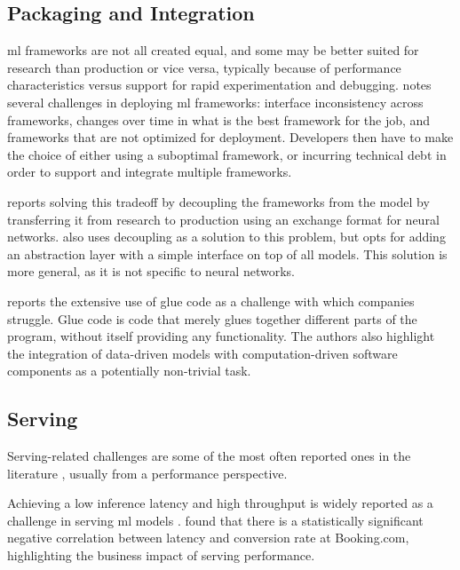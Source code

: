 \subsection{Packaging and Integration}
\acrshort{ml} frameworks are not all created equal, and some may be better suited for research than production or vice versa, typically because of performance characteristics versus support for rapid experimentation and debugging.
\cite{Crankshaw2017} notes several challenges in deploying \acrshort{ml} frameworks: interface inconsistency across frameworks, changes over time in what is the best framework for the job, and frameworks that are not optimized for deployment.
Developers then have to make the choice of either using a suboptimal framework, or incurring technical debt in order to support and integrate multiple frameworks.

\cite{Hazelwood2018} reports solving this tradeoff by decoupling the frameworks from the model by transferring it from research to production using an exchange format for neural networks.
\cite{Crankshaw2017} also uses decoupling as a solution to this problem, but opts for adding an abstraction layer with a simple interface on top of all models.
This solution is more general, as it is not specific to neural networks.

\cite{Bosch2021} reports the extensive use of glue code as a challenge with which companies struggle.
Glue code is code that merely glues together different parts of the program, without itself providing any functionality.
The authors also highlight the integration of data-driven models with computation-driven software components as a potentially non-trivial task.

\subsection{Serving}
Serving-related challenges are some of the most often reported ones in the literature \cite{Bosch2021, Richins2020, Li2017, Baylor2017, Garcia2020, Crankshaw2017, Lwakatare2019, Bernardi2019, Yadwadkar2019, Chahal2020, Choi2021, Zhang2020, Gupta2020}, usually from a performance perspective.

Achieving a low inference latency and high throughput is widely reported as a challenge in serving \acrshort{ml} models \cite{Bosch2021, Li2017,Crankshaw2017,Lwakatare2019,Bernardi2019}.
\textcite{Bernardi2019} found that there is a statistically significant negative correlation between latency and conversion rate at Booking.com, highlighting the business impact of serving performance.

